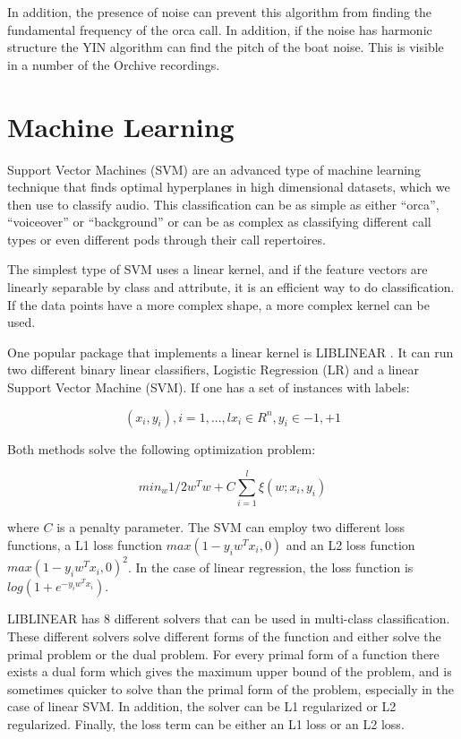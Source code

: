 \documentclass[12pt,oneside]{book}
\begin{document}
In addition, the presence of noise can prevent this algorithm from
finding the fundamental frequency of the orca call.  In addition, if
the noise has harmonic structure the YIN algorithm can find the pitch
of the boat noise.  This is visible in a number of the Orchive
recordings.

\section{Machine Learning}

Support Vector Machines (SVM) \cite{cortes1995svm} are an advanced
type of machine learning technique that finds optimal hyperplanes in
high dimensional datasets, which we then use to classify audio.  This
classification can be as simple as either ``orca'', ``voiceover'' or
``background'' or can be as complex as classifying different call
types or even different pods through their call repertoires.

The simplest type of SVM uses a linear kernel, and if the feature
vectors are linearly separable by class and attribute, it is an
efficient way to do classification.  If the data points have a more
complex shape, a more complex kernel can be used.

One popular package that implements a linear kernel is LIBLINEAR
\cite{rongen2008liblinear}.  It can run two different binary linear
classifiers, Logistic Regression (LR) and a linear Support Vector
Machine (SVM).  If one has a set of instances with labels:

\begin{equation} 
(x_i, y_i), i=1,...,l x_i \in R^n, y_i \in {-1,+1} 
\end{equation}

Both methods solve the following optimization problem:

\begin{equation} 
min_w  1/2 w^T w + C \sum_{i=1}^l{\xi(w;x_i,y_i)} 
\end{equation}

\noindent where $C$ is a penalty parameter.  The SVM can employ two different loss
functions, a L1 loss function $max(1-y_i w^T x_i, 0)$ and an L2 loss
function $max(1-y_i w^T x_i, 0)^2$.  In the case of linear regression,
the loss function is $log(1+ e^{-y_i w^T x_i})$.

LIBLINEAR has 8 different solvers that can be used in multi-class
classification.  These different solvers solve different forms of the
function and either solve the primal problem or the dual problem.  For
every primal form of a function there exists a dual form which gives
the maximum upper bound of the problem, and is sometimes quicker to
solve than the primal form of the problem, especially in the case of
linear SVM.  In addition, the solver can be L1 regularized or L2
regularized.  Finally, the loss term can be either an L1 loss or an L2
loss.
\end{document}
